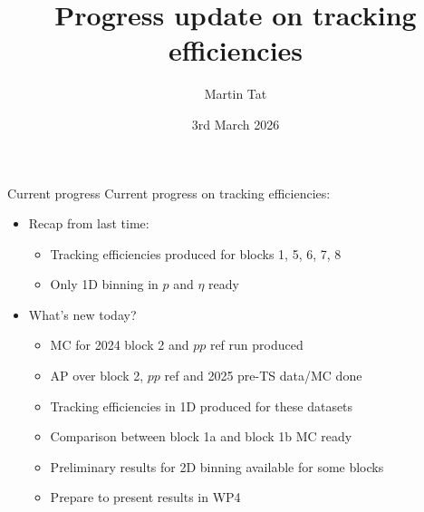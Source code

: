 \documentclass[xcolor={dvipsnames}]{beamer}
\title[Heidelberg tracking meeting]{Progress update on tracking efficiencies}
\author[Martin Tat]{Martin Tat}
\institute[Heidelberg]{Heidelberg University}
\date{3rd March 2026}
\begin{document}
\begin{frame}
  \titlepage
\end{frame}


\begin{frame}{Current progress}
  \vspace{0.0cm}
  {\Large Current progress on tracking efficiencies:}
  \vspace{0.2cm}
  \begin{itemize}
    \setlength\itemsep{0.8em}
    \item{Recap from last time:}
    \begin{itemize}
      \item[-]{Tracking efficiencies produced for blocks 1, 5, 6, 7, 8}
      \item[-]{Only 1D binning in $p$ and $\eta$ ready}
    \end{itemize}
    \item{What's new today?}
    \begin{itemize}
      \item[-]{MC for 2024 block 2 and $pp$ ref run produced}
      \item[-]{AP over block 2, $pp$ ref and 2025 pre-TS data/MC done}
      \item[-]{Tracking efficiencies in 1D produced for these datasets}
      \item[-]{Comparison between block 1a and block 1b MC ready}
      \item[-]{Preliminary results for 2D binning available for some blocks}
      \item[-]{Prepare to present results in WP4}
    \end{itemize}
  \end{itemize}
\end{frame}
\end{document}
